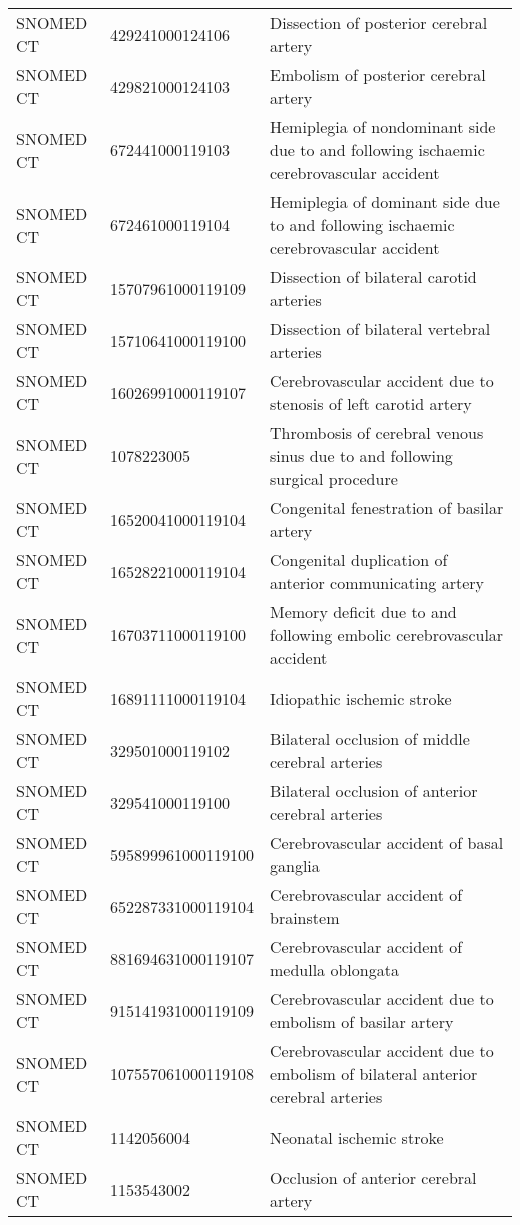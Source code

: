 \begin{longtable}{p{}p{}p{}}
  SNOMED CT & 429241000124106 & Dissection of posterior cerebral artery \\ 
  SNOMED CT & 429821000124103 & Embolism of posterior cerebral artery \\ 
  SNOMED CT & 672441000119103 & Hemiplegia of nondominant side due to and following ischaemic cerebrovascular accident \\ 
  SNOMED CT & 672461000119104 & Hemiplegia of dominant side due to and following ischaemic cerebrovascular accident \\ 
  SNOMED CT & 15707961000119109 & Dissection of bilateral carotid arteries \\ 
  SNOMED CT & 15710641000119100 & Dissection of bilateral vertebral arteries \\ 
  SNOMED CT & 16026991000119107 & Cerebrovascular accident due to stenosis of left carotid artery \\ 
  SNOMED CT & 1078223005 & Thrombosis of cerebral venous sinus due to and following surgical procedure \\ 
  SNOMED CT & 16520041000119104 & Congenital fenestration of basilar artery \\ 
  SNOMED CT & 16528221000119104 & Congenital duplication of anterior communicating artery \\ 
  SNOMED CT & 16703711000119100 & Memory deficit due to and following embolic cerebrovascular accident \\ 
  SNOMED CT & 16891111000119104 & Idiopathic ischemic stroke \\ 
  SNOMED CT & 329501000119102 & Bilateral occlusion of middle cerebral arteries \\ 
  SNOMED CT & 329541000119100 & Bilateral occlusion of anterior cerebral arteries \\ 
  SNOMED CT & 595899961000119100 & Cerebrovascular accident of basal ganglia \\ 
  SNOMED CT & 652287331000119104 & Cerebrovascular accident of brainstem \\ 
  SNOMED CT & 881694631000119107 & Cerebrovascular accident of medulla oblongata \\ 
  SNOMED CT & 915141931000119109 & Cerebrovascular accident due to embolism of basilar artery \\ 
  SNOMED CT & 107557061000119108 & Cerebrovascular accident due to embolism of bilateral anterior cerebral arteries \\ 
  SNOMED CT & 1142056004 & Neonatal ischemic stroke \\ 
  SNOMED CT & 1153543002 & Occlusion of anterior cerebral artery \\ 

\end{longtable}
